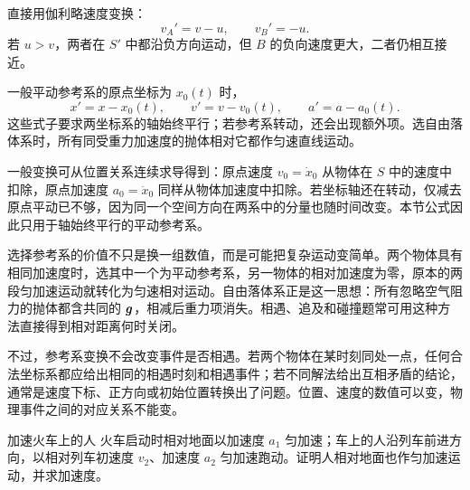 {\begin{xesolution}
直接用伽利略速度变换：
\[
\boxed{v_A'=v-u},\qquad \boxed{v_B'=-u}.
\]
若 $u>v$，两者在 $S'$ 中都沿负方向运动，但 $B$ 的负向速度更大，二者仍相互接近。
\end{xesolution}

一般平动参考系的原点坐标为 $x_0(t)$ 时，
\begin{equation}
x'=x-x_0(t),\qquad v'=v-v_0(t),\qquad a'=a-a_0(t).
\end{equation}
这些式子要求两坐标系的轴始终平行；若参考系转动，还会出现额外项。选自由落体系时，所有同受重力加速度的抛体相对它都作匀速直线运动。

一般变换可从位置关系连续求导得到：原点速度 $v_0=\dot x_0$ 从物体在 $S$ 中的速度中扣除，原点加速度 $a_0=\ddot x_0$ 同样从物体加速度中扣除。若坐标轴还在转动，仅减去原点平动已不够，因为同一个空间方向在两系中的分量也随时间改变。本节公式因此只用于轴始终平行的平动参考系。

选择参考系的价值不只是换一组数值，而是可能把复杂运动变简单。两个物体具有相同加速度时，选其中一个为平动参考系，另一物体的相对加速度为零，原本的两段匀加速运动就转化为匀速相对运动。自由落体系正是这一思想：所有忽略空气阻力的抛体都含共同的 $\bm{g}$，相减后重力项消失。相遇、追及和碰撞题常可用这种方法直接得到相对距离何时关闭。

不过，参考系变换不会改变事件是否相遇。若两个物体在某时刻同处一点，任何合法坐标系都应给出相同的相遇时刻和相遇事件；若不同解法给出互相矛盾的结论，通常是速度下标、正方向或初始位置转换出了问题。位置、速度的数值可以变，物理事件之间的对应关系不能变。


\begin{origexamplebox}{加速火车上的人}\label{ch04:ex:k07-2-76}
火车启动时相对地面以加速度 $a_1$ 匀加速；车上的人沿列车前进方向，以相对列车初速度 $v_2$、加速度 $a_2$ 匀加速跑动。证明人相对地面也作匀加速运动，并求加速度。


\end{origexamplebox}}
